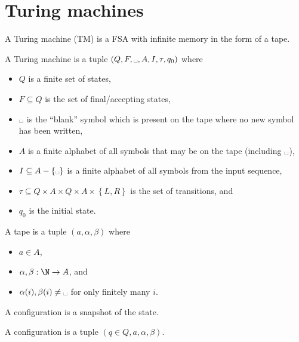 \documentclass{article}
\DeclareMathOperator{\blank}{\text{\textvisiblespace}}
\begin{document}
\section{Turing machines}
\begin{definition}
    A Turing machine (TM) is a FSA with infinite memory
    in the form of a tape.
    
    A Turing machine is a tuple \(\left(Q, F, \blank, A, I, \tau, q_0\right)\) where
    \begin{itemize}
        \item    \(Q\) is a finite set of states,
        \item    \(F\subseteq Q\) is the set of final/accepting states,
        \item    \(\blank\) is the ``blank'' symbol
        which is present on the tape where no new symbol has been written,
        \item    \(A\) is a finite alphabet of all symbols
        that may be on the tape (including \(\blank\)),
        \item    \(I\subseteq A - \left\{\blank\right\}\) is a finite alphabet of all
        symbols from the input sequence,
        \item    \(\tau\subseteq Q\times A\times Q\times A\times \left\{L, R\right\}\)
        is the set of transitions, and
        \item    \(q_0\) is the initial state.
    \end{itemize}
\end{definition}
\begin{definition}[Tape]
    A tape is a tuple \(\left(a, \alpha, \beta\right)\) where
    \begin{itemize}
        \item \(a\in A\),
        \item \(\alpha, \beta : \N\to A\), and
        \item \(\alpha(i), \beta(i) \ne \blank\) for only finitely many \(i\).
    \end{itemize}
\end{definition}
\begin{definition}[Configuration]
    A configuration is a snapshot of the state.

    A configuration is a tuple \(\left(q\in Q, a, \alpha, \beta\right)\).
\end{definition}
\end{document}
